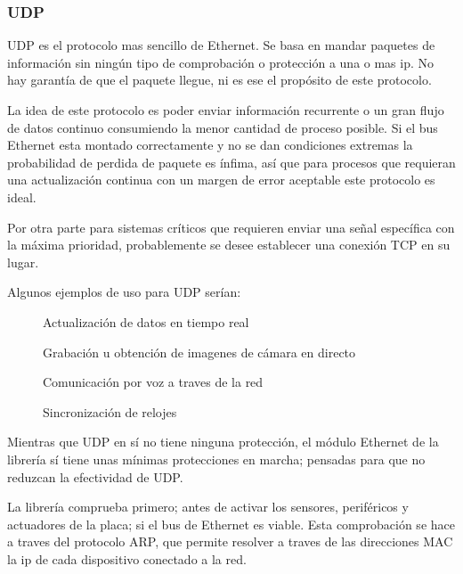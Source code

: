 \documentclass{report}
\begin{document}
\subsubsection{UDP}
UDP es el protocolo mas sencillo de Ethernet. Se basa en mandar paquetes de información sin ningún tipo de comprobación o protección a una o mas ip. No hay garantía de que el paquete llegue, ni es ese el propósito de este protocolo. 
\par \vspace{0.3cm}
La idea de este protocolo es poder enviar información recurrente o un gran flujo de datos continuo consumiendo la menor cantidad de proceso posible. Si el bus Ethernet esta montado correctamente y no se dan condiciones extremas la probabilidad de perdida de paquete es ínfima, así que para procesos que requieran una actualización continua con un margen de error aceptable este protocolo es ideal. 
\par \vspace{0.3cm}
Por otra parte para sistemas críticos que requieren enviar una señal específica con la máxima prioridad, probablemente se desee establecer una conexión TCP en su lugar. 
\par \vspace{0.3cm}
Algunos ejemplos de uso para UDP serían:
\begin{figure}[H]
\cdot \hspace{0.1cm} Actualización de datos en tiempo real \par
\cdot \hspace{0.1cm} Grabación u obtención de imagenes de cámara en directo \par
\cdot \hspace{0.1cm} Comunicación por voz a traves de la red \par
\cdot \hspace{0.1cm} Sincronización de relojes 
\label{UDPuses}
\end{figure}
\par \vspace{0.3cm}
Mientras que UDP en sí no tiene ninguna protección, el módulo Ethernet de la librería sí tiene unas mínimas protecciones en marcha; pensadas para que no reduzcan la efectividad de UDP.
\par
La librería comprueba primero; antes de activar los sensores, periféricos y actuadores de la placa; si el bus de Ethernet es viable. Esta comprobación se hace a traves del protocolo ARP, que permite resolver a traves de las direcciones MAC la ip de cada dispositivo conectado a la red. 
\end{document}
